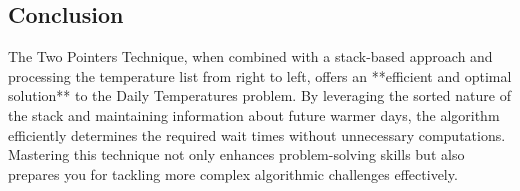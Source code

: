 \subsection*{Conclusion}
The Two Pointers Technique, when combined with a stack-based approach and processing the temperature list from right to left, offers an **efficient and optimal solution** to the Daily Temperatures problem. By leveraging the sorted nature of the stack and maintaining information about future warmer days, the algorithm efficiently determines the required wait times without unnecessary computations. Mastering this technique not only enhances problem-solving skills but also prepares you for tackling more complex algorithmic challenges effectively.